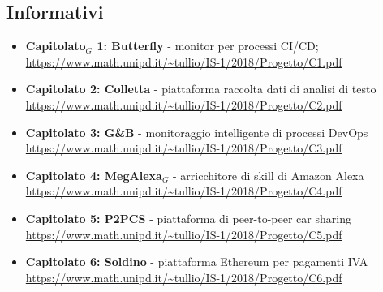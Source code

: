 \subsection{Informativi}
\begin{itemize}
\item \textbf{Capitolato$_{G}$ 1: Butterfly} - monitor per processi CI/CD;\\
\url{https://www.math.unipd.it/~tullio/IS-1/2018/Progetto/C1.pdf}
\item \textbf{Capitolato 2: Colletta} - piattaforma raccolta dati di analisi di testo\\
\url{https://www.math.unipd.it/~tullio/IS-1/2018/Progetto/C2.pdf}
\item \textbf{Capitolato 3: G\&B} - monitoraggio intelligente di processi DevOps\\
\url{https://www.math.unipd.it/~tullio/IS-1/2018/Progetto/C3.pdf}
\item \textbf{Capitolato 4: MegAlexa$_{G}$} - arricchitore di skill di Amazon Alexa\\
\url{https://www.math.unipd.it/~tullio/IS-1/2018/Progetto/C4.pdf}
\item \textbf{Capitolato 5: P2PCS} - piattaforma di peer-to-peer car sharing\\
\url{https://www.math.unipd.it/~tullio/IS-1/2018/Progetto/C5.pdf}
\item \textbf{Capitolato 6: Soldino} - piattaforma Ethereum per pagamenti IVA\\
\url{https://www.math.unipd.it/~tullio/IS-1/2018/Progetto/C6.pdf}

\end{itemize}
